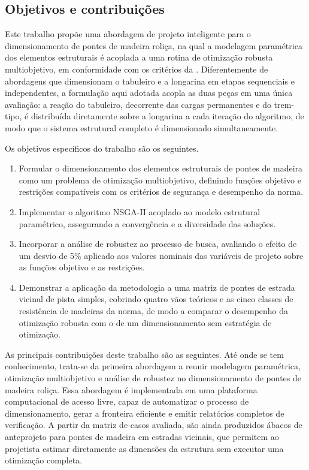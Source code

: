 \subsection{Objetivos e contribuições}\label{sec:objetivos_contribuicoes}

Este trabalho propõe uma abordagem de projeto inteligente para o dimensionamento de pontes de madeira roliça, na qual a modelagem paramétrica dos elementos estruturais é acoplada a uma rotina de otimização robusta multiobjetivo, em conformidade com os critérios da \textcite{NBR7190-1:2022}.
Diferentemente de abordagens que dimensionam o tabuleiro e a longarina em etapas sequenciais e independentes, a formulação aqui adotada acopla as duas peças em uma única avaliação: a reação do tabuleiro, decorrente das cargas permanentes e do trem-tipo, é distribuída diretamente sobre a longarina a cada iteração do algoritmo, de modo que o sistema estrutural completo é dimensionado simultaneamente.

Os objetivos específicos do trabalho são os seguintes.
\begin{enumerate}[label=(\roman*)]
    \item Formular o dimensionamento dos elementos estruturais de pontes de madeira como um problema de otimização multiobjetivo, definindo funções objetivo e restrições compatíveis com os critérios de segurança e desempenho da norma.
    \item Implementar o algoritmo NSGA-II acoplado ao modelo estrutural paramétrico, assegurando a convergência e a diversidade das soluções.
    \item Incorporar a análise de robustez ao processo de busca, avaliando o efeito de um desvio de 5\% aplicado aos valores nominais das variáveis de projeto sobre as funções objetivo e as restrições.
    \item Demonstrar a aplicação da metodologia a uma matriz de pontes de estrada vicinal de pista simples, cobrindo quatro vãos teóricos e as cinco classes de resistência de madeiras da norma, de modo a comparar o desempenho da otimização robusta com o de um dimensionamento sem estratégia de otimização.
\end{enumerate}

As principais contribuições deste trabalho são as seguintes. Até onde se tem conhecimento, trata-se da primeira abordagem a reunir modelagem paramétrica, otimização multiobjetivo e análise de robustez no dimensionamento de pontes de madeira roliça. Essa abordagem é implementada em uma plataforma computacional de acesso livre, capaz de automatizar o processo de dimensionamento, gerar a fronteira eficiente e emitir relatórios completos de verificação. A partir da matriz de casos avaliada, são ainda produzidos ábacos de anteprojeto para pontes de madeira em estradas vicinais, que permitem ao projetista estimar diretamente as dimensões da estrutura sem executar uma otimização completa.
